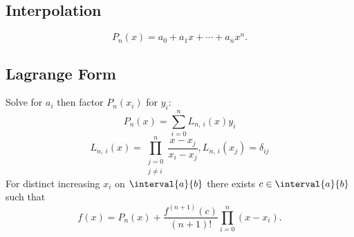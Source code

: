 \documentclass{article}
\begin{document}
\begin{multicols}{3}
    \section{Interpolation}
    \begin{equation*}
        P_n\left( x \right) = a_0 + a_1 x + \cdots + a_n x^n.
    \end{equation*}
    \subsection{Lagrange Form}
    Solve for \(a_i\) then factor \(P_n\left( x_i \right)\) for \(y_i\):
    \begin{equation*}
        P_n\left( x \right) = \sum_{i = 0}^n L_{n,\: i}\left( x \right) y_i
    \end{equation*}
    \begin{equation*}
        L_{n,\: i}\left( x \right) = \prod_{\substack{j = 0 \\ j \neq i}}^n \frac{x - x_j}{x_i - x_j}, L_{n,\: i}\left( x_j \right) = \delta_{ij}
    \end{equation*}
    For distinct increasing \(x_i\) on \(\interval{a}{b}\) there exists \(c \in \interval{a}{b}\) such that
    \begin{equation*}
        f\left( x \right) = P_n\left( x \right) + \frac{f^{\left( n + 1 \right)} \left( c \right)}{\left( n + 1 \right)!} \prod_{i = 0}^n \left( x - x_i \right).
    \end{equation*}

\end{multicols}
\end{document}
